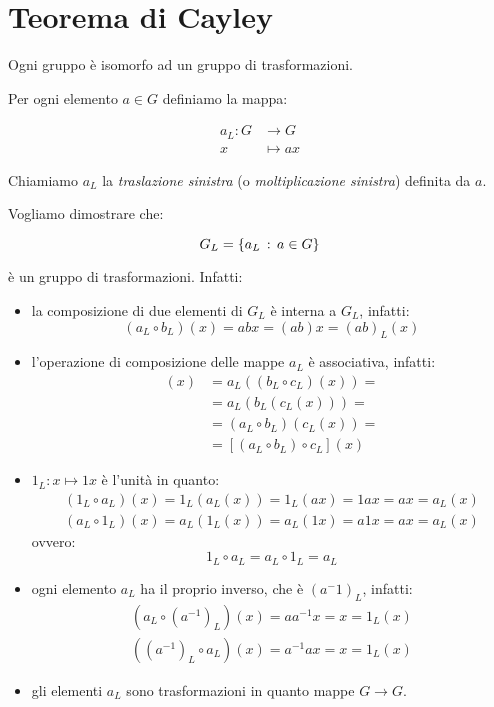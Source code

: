 \chapter{Teorema di Cayley}

\begin{teorema}
	\label{thr:Cayley}
	Ogni gruppo è isomorfo ad un gruppo di trasformazioni.
\end{teorema}
\begin{dimostrazione}
	Per ogni elemento $a \in G$ definiamo la mappa:
	
	\begin{align}
		a_L : G &\longrightarrow G \\
		x &\longmapsto ax
	\end{align}

	Chiamiamo $a_L$ la \emph{traslazione sinistra} (o \emph{moltiplicazione sinistra}) definita da $a$.
	
	Vogliamo dimostrare che:
	
	\begin{equation}
		G_L = \{a_L \,:\, a \in G\}
	\end{equation}

	è un gruppo di trasformazioni. Infatti:
	
	\begin{itemize}
		\item la composizione di due elementi di $G_L$ è interna a $G_L$, infatti:
			\begin{equation}
				(a_L \circ b_L)(x) = abx = (ab)x = (ab)_L(x)
			\end{equation}
		\item l'operazione di composizione delle mappe $a_L$ è associativa, infatti:
			\begin{align}
				[a_L \circ (b_L \circ c_L)](x) &=  a_L((b_L \circ c_L)(x)) = \\
				&= a_L(b_L(c_L(x))) = \\
				&= (a_L \circ b_L)(c_L(x)) = \\
				&= [(a_L \circ b_L) \circ c_L](x)
			\end{align}
		\item $1_L: x \longmapsto 1x$ è l'unità in quanto:
			\begin{gather}
				(1_L \circ a_L)(x) = 1_L(a_L(x)) = 1_L(ax) = 1ax = ax = a_L(x) \\
				(a_L \circ 1_L)(x) = a_L(1_L(x)) = a_L(1x) = a1x = ax = a_L(x)
			\end{gather}
			ovvero:
			\begin{equation}
				1_L \circ a_L = a_L \circ 1_L = a_L
			\end{equation}
		\item ogni elemento $a_L$ ha il proprio inverso, che è $(a^-1)_L$, infatti:
			\begin{gather}
				(a_L \circ (a^{-1})_L)(x) = aa^{-1}x = x = 1_L(x) \\
				((a^{-1})_L \circ a_L)(x) = a^{-1}ax = x = 1_L(x) 
			\end{gather}
		\item gli elementi $a_L$ sono trasformazioni in quanto mappe $G \longrightarrow G$.
	\end{itemize}
	

\end{dimostrazione}
